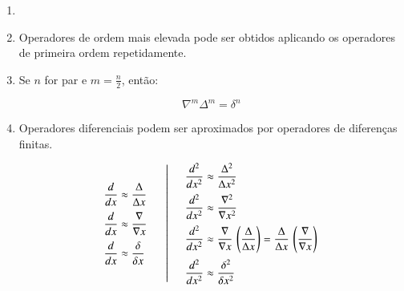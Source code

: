 \begin{enumerate}

\item {}

\item Operadores de ordem mais elevada pode ser obtidos aplicando  os operadores de primeira ordem repetidamente.

\item Se $n$ for par e $\displaystyle m = \frac{n}{2}$, então:

\[
 \nabla^m \Delta^m = \delta^n
\]

\item Operadores diferenciais podem ser aproximados por operadores de diferenças finitas.

\[
 \begin{array}{l}
  \displaystyle \frac{d}{dx} \approx \frac{\Delta}{\Delta x} \vspace*{0.2cm} \\
  \displaystyle \frac{d}{dx} \approx \frac{\nabla}{\nabla x} \vspace*{0.2cm} \\
  \displaystyle \frac{d}{dx} \approx \frac{\delta}{\delta x}
 \end{array} \quad
 \left| \quad
 \begin{array}{l}
  \displaystyle \frac{d^2}{dx^2} \approx \frac{\Delta^2}{\Delta x^2} \vspace*{0.2cm} \\
  \displaystyle \frac{d^2}{dx^2} \approx \frac{\nabla^2}{\nabla x^2} \vspace*{0.2cm} \\
  \displaystyle \frac{d^2}{dx^2} \approx \frac{\nabla}{\nabla x} \, \left( \frac{\Delta}{\Delta x} \right) = \frac{\Delta}{\Delta x} \, \left( \frac{\nabla}{\nabla x} \right) \vspace*{0.2cm} \\
  \displaystyle \frac{d^2}{dx^2} \approx \frac{\delta^2}{\delta x^2}
 \end{array}
 \right.
\]

\end{enumerate}
